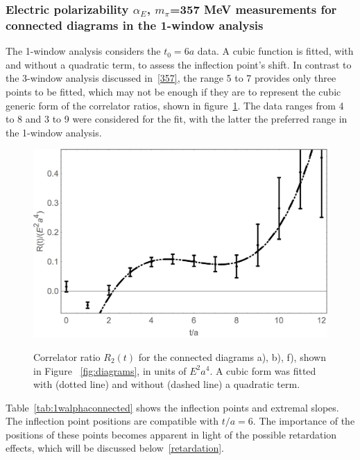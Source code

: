 
\subsubsection{Electric polarizability $\alpha_E$, $m_{\pi}$=357 MeV measurements for
connected diagrams in the 1-window analysis}
\label{3571w}
The 1-window analysis considers the $t_0=6a$ data. A cubic function is
fitted, with and without a quadratic term, to assess the inflection point's shift.
In contrast to the 3-window analysis discussed in~\ref{357}, the range 5 to 7 provides
only three points to be fitted, which may not be enough if they are to represent the
cubic generic form of the correlator ratios, shown in figure~\ref{fig:1walpha}. The data ranges from 
4 to 8 and 3 to 9 were considered for the fit, with the latter the preferred range in 
the 1-window analysis.

\begin{figure}[H]
\centering
\includegraphics[width=.65\linewidth]{figures/shshQuadCS.png}\\
\caption{Correlator ratio $R_2(t)$ for the connected diagrams a), b), f), shown in Figure ~\ref{fig:diagrams}, in units of $E^2a^4$. A cubic form was fitted with (dotted line) and without (dashed line) a quadratic term.}
\label{fig:1walpha}
\end{figure}

Table~\ref{tab:1walphaconnected} shows the inflection points and extremal slopes. The inflection
point positions are compatible with $t/a=6$. The importance of the positions
of these points becomes apparent in light of the possible retardation effects,
which will be discussed below~\ref{retardation}.

